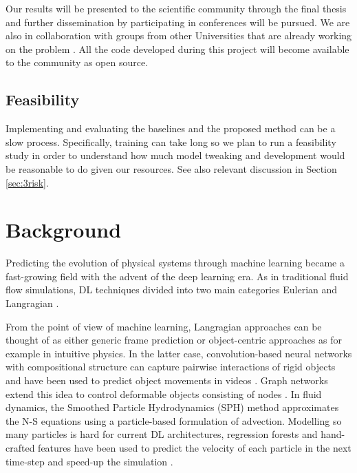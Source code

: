 \documentclass[a4paper,11pt]{article}
\begin{document}
Our results will be presented to the scientific community through the final thesis and further dissemination by participating in conferences will be pursued. We are also in collaboration with groups from other Universities that are already working on the problem \cite{sorteberg2018approximating}. All the code developed during this project will become available to the community as open source.

\subsection{Feasibility}

Implementing and evaluating the baselines and the proposed method can be a slow process. Specifically, training can take long so we plan to run a feasibility study in order to understand how much model tweaking and development would be reasonable to do given our resources. See also relevant discussion in Section \ref{sec:3risk}. 

\vskip -6mm
\section{Background}\label{sec:2background}
Predicting the evolution of physical systems through machine learning became a fast-growing field with the advent of the deep learning era. As in traditional fluid flow simulations, DL techniques divided into two main categories Eulerian and Langragian \cite{zhang2007comparison}.

 From the point of view of machine learning, Langragian approaches can be thought of as either generic frame prediction or object-centric approaches as for example in intuitive physics. In the latter case, convolution-based neural networks with compositional structure can capture pairwise interactions of rigid objects and have been used to predict object movements in videos \cite{watters2017visualvin}. Graph networks extend this idea to control deformable objects consisting of nodes \cite{battaglia2018relationalgn}. In fluid dynamics, the Smoothed Particle Hydrodynamics (SPH) method approximates the N-S equations using a particle-based formulation of advection. Modelling so many particles is hard for current DL architectures, regression forests and hand-crafted features have been used to predict the velocity of each particle in the next time-step and speed-up the simulation \cite{jeong2015dataladickyforest}. 
 
\end{document}

